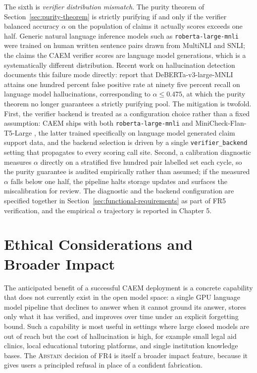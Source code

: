 The sixth is \emph{verifier distribution mismatch}. The purity theorem of Section~\ref{sec:purity-theorem} is strictly purifying if and only if the verifier balanced accuracy $\alpha$ on the population of claims it actually scores exceeds one half. Generic natural language inference models such as \texttt{roberta-large-mnli} were trained on human written sentence pairs drawn from MultiNLI and SNLI; the claims the CAEM verifier scores are language model generations, which is a systematically different distribution. Recent work on hallucination detection documents this failure mode directly: \citet{semanticillusion2025} report that DeBERTa-v3-large-MNLI attains one hundred percent false positive rate at ninety five percent recall on language model hallucinations, corresponding to $\alpha \le 0.475$, at which the purity theorem no longer guarantees a strictly purifying pool. The mitigation is twofold. First, the verifier backend is treated as a configuration choice rather than a fixed assumption: CAEM ships with both \texttt{roberta-large-mnli} and MiniCheck-Flan-T5-Large \citep{tang2024minicheck}, the latter trained specifically on language model generated claim support data, and the backend selection is driven by a single \texttt{verifier\_backend} setting that propagates to every scoring call site. Second, a calibration diagnostic measures $\alpha$ directly on a stratified five hundred pair labelled set each cycle, so the purity guarantee is audited empirically rather than assumed; if the measured $\alpha$ falls below one half, the pipeline halts storage updates and surfaces the miscalibration for review. The diagnostic and the backend configuration are specified together in Section~\ref{sec:functional-requirements} as part of FR5 verification, and the empirical $\alpha$ trajectory is reported in Chapter 5.

\section{Ethical Considerations and Broader Impact}
\label{sec:impact}

The anticipated benefit of a successful CAEM deployment is a concrete capability that does not currently exist in the open model space: a single GPU language model pipeline that declines to answer when it cannot ground its answer, stores only what it has verified, and improves over time under an explicit forgetting bound. Such a capability is most useful in settings where large closed models are out of reach but the cost of hallucination is high, for example small legal aid clinics, local educational tutoring platforms, and single institution knowledge bases. The \textsc{Abstain} decision of FR4 is itself a broader impact feature, because it gives users a principled refusal in place of a confident fabrication.

